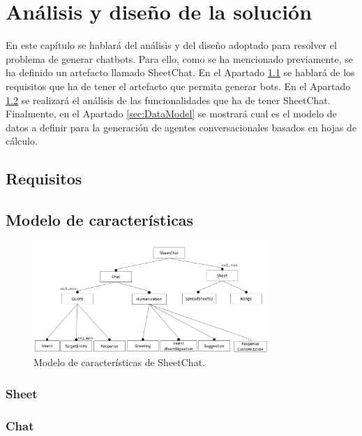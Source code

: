 \chapter{Análisis y diseño de la solución}
\label{cha:AnalysisAndDesign}

En este capítulo se hablará del análisis y del diseño adoptado para resolver el problema de generar chatbots. Para ello, como se ha mencionado previamente, se ha definido un artefacto llamado SheetChat. En el Apartado \ref{sec:Requisitos} se hablará de los requisitos que ha de tener el artefacto que permita generar bots. En el Apartado \ref{sec:FeatureModel} se realizará el análisis de las funcionalidades que ha de tener SheetChat. Finalmente, en el Apartado \ref{sec:DataModel} se mostrará cual es el modelo de datos a definir para la generación de agentes conversacionales basados en hojas de cálculo.

\section{Requisitos}
\label{sec:Requisitos}

\section{Modelo de características}
\label{sec:FeatureModel}

\begin{figure}[htb]
	\centering
	\includegraphics[width=0.8\textwidth]{./figs/FeatureModel.png}
	\caption{Modelo de características de SheetChat.}
	\label{fig:FeatureModel}
\end{figure}

\subsection{Sheet}
\label{sec:Sheet}


\subsection{Chat}
\label{sec:Chat}

